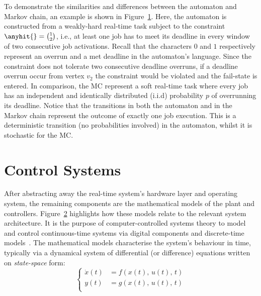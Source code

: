 \begin{figure}[t]
    \centering
    
    \caption{}
    \label{fig:kappa:state-machine}
\end{figure}
%
To demonstrate the similarities and differences between the automaton and Markov chain, an example is shown in Figure~\ref{fig:kappa:state-machine}.
Here, the automaton is constructed from a weakly-hard real-time task subject to the constraint $\anyhit{} = \binom{1}{2}$, i.e., at least one job has to meet its deadline in every window of two consecutive job activations.
Recall that the characters $0$ and $1$ respectively represent an overrun and a met deadline in the automaton's language.
Since the constraint does not tolerate two consecutive deadline overruns, if a deadline overrun occur from vertex $v_2$ the constraint would be violated and the fail-state is entered.
In comparison, the MC represent a soft real-time task where every job has an independent and identically distributed (i.i.d) probability $p$ of overrunning its deadline.
Notice that the transitions in both the automaton and in the Markov chain represent the outcome of exactly one job execution.
This is a deterministic transition (no probabilities involved) in the automaton, whilst it is stochastic for the MC.



\section{Control Systems}%
\label{sec:background:ctrl}%
%
\begin{figure}[t]
    \centering
    
    \caption{}
    \label{fig:control-structure-abstraction}
\end{figure}
%
After abstracting away the real-time system's hardware layer and operating system, the remaining components are the mathematical models of the plant and controllers.
Figure~\ref{fig:control-structure-abstraction} highlights how these models relate to the relevant system architecture.
It is the purpose of computer-controlled systems theory to model and control continuous-time systems via digital components and discrete-time models~\cite{Astrom:1997}.
The mathematical models characterise the system's behaviour in time, typically via a dynamical system of differential (or difference) equations written on \emph{state-space} form:
%
\begin{equation}%
    \label{eq:state-space}%
    \left\{\begin{aligned}
        \dot{x}(t) &= f(x(t),\, u(t),\, t) \\
        y(t) &= g(x(t),\, u(t),\, t) \\
    \end{aligned}\right.
\end{equation}

